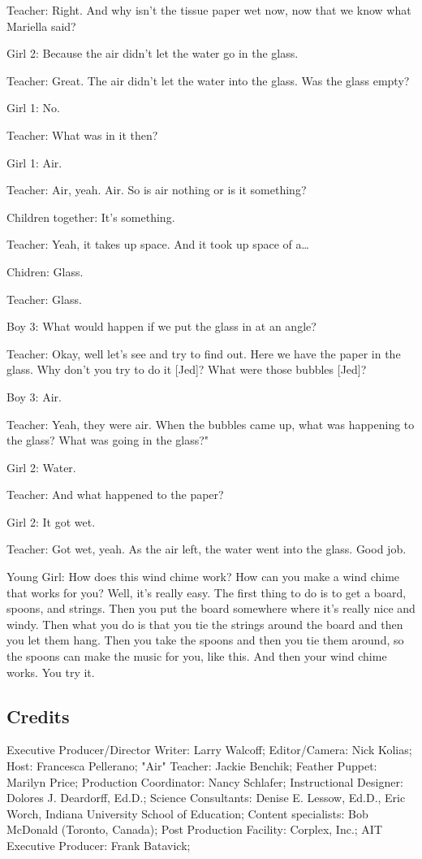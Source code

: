 Teacher: Right. And why isn't the tissue paper wet now, now that we know what Mariella said?

Girl 2: Because the air didn't let the water go in the glass.

Teacher: Great. The air didn't let the water into the glass. Was the glass empty?

Girl 1: No.

Teacher: What was in it then?

Girl 1: Air.

Teacher: Air, yeah. Air. So is air nothing or is it something?

Children together: It's something.

Teacher: Yeah, it takes up space. And it took up space of a\dots

Chidren: Glass.

Teacher: Glass.

Boy 3: What would happen if we put the glass in at an angle?

Teacher: Okay, well let's see and try to find out. Here we have the paper in the glass. Why don't you try to do it [Jed]? What were those bubbles [Jed]?

Boy 3: Air.

Teacher: Yeah, they were air. When the bubbles came up, what was happening to the glass? What was going in the glass?"

Girl 2: Water.

Teacher: And what happened to the paper?

Girl 2: It got wet.

Teacher: Got wet, yeah. As the air left, the water went into the glass. Good job.

Young Girl: How does this wind chime work? How can you make a wind chime that works for you? Well, it's really easy. The first thing to do is to get a board, spoons, and strings. Then you put the board somewhere where it's really nice and windy. Then what you do is that you tie the strings around the board and then you let them hang. Then you take the spoons and then you tie them around, so the spoons can make the music for you, like this. And then your wind chime works. You try it.

\subsection{Credits}

Executive Producer/Director Writer: Larry Walcoff;
Editor/Camera: Nick Kolias;
Host: Francesca Pellerano;
"Air" Teacher: Jackie Benchik;
Feather Puppet: Marilyn Price;
Production Coordinator: Nancy Schlafer;
Instructional Designer: Dolores J. Deardorff, Ed.D.;
Science Consultants: Denise E. Lessow, Ed.D., Eric Worch, Indiana University School of Education;
Content specialists: Bob McDonald (Toronto, Canada);
Post Production Facility: Corplex, Inc.;
AIT Executive Producer: Frank Batavick;

